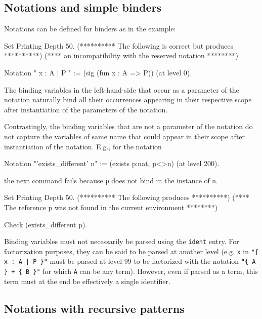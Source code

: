 \subsection{Notations and simple binders}

Notations can be defined for binders as in the example:

\begin{coq_eval}
Set Printing Depth 50.
(********** The following is correct but produces **********)
(**** an incompatibility with the reserved notation ********)
\end{coq_eval}
\begin{coq_example*}
Notation "{ x : A  |  P  }" := (sig (fun x : A => P)) (at level 0).
\end{coq_example*}

The binding variables in the left-hand-side that occur as a parameter
of the notation naturally bind all their occurrences appearing in
their respective scope after instantiation of the parameters of the
notation.

Contrastingly, the binding variables that are not a parameter of the
notation do not capture the variables of same name that
could appear in their scope after instantiation of the
notation. E.g., for the notation

\begin{coq_example*}
Notation "'exists_different' n" := (exists p:nat, p<>n) (at level 200).
\end{coq_example*}
the next command fails because {\tt p} does not bind in 
the instance of {\tt n}.
\begin{coq_eval}
Set Printing Depth 50.
(********** The following produces **********)
(**** The reference p was not found in the current environment ********)
\end{coq_eval}
\begin{coq_example}
Check (exists_different p).
\end{coq_example}

\Rem Binding variables must not necessarily be parsed using the
{\tt ident} entry. For factorization purposes, they can be said to be
parsed at another level (e.g. {\tt x} in \verb="{ x : A | P }"= must be
parsed at level 99 to be factorized with the notation
\verb="{ A } + { B }"= for which {\tt A} can be any term).  
However, even if parsed as a term, this term must at the end be effectively 
a single identifier.

\subsection{Notations with recursive patterns}
\label{RecursiveNotations}

